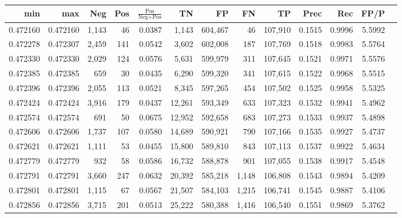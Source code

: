 \begin{tabular}{rrrrrrrrrrrrr}
\toprule
     min &      max &   Neg &   Pos & $\frac{\text{Pos}}{\text{Neg}+\text{Pos}}$ &      TN &      FP &      FN &      TP &   Prec &    Rec &   FP/P \\
\midrule
0.472160 & 0.472160 & 1,143 &    46 &                                     0.0387 &   1,143 & 604,467 &      46 & 107,910 & 0.1515 & 0.9996 & 5.5992 \\
0.472278 & 0.472307 & 2,459 &   141 &                                     0.0542 &   3,602 & 602,008 &     187 & 107,769 & 0.1518 & 0.9983 & 5.5764 \\
0.472330 & 0.472330 & 2,029 &   124 &                                     0.0576 &   5,631 & 599,979 &     311 & 107,645 & 0.1521 & 0.9971 & 5.5576 \\
0.472385 & 0.472385 &   659 &    30 &                                     0.0435 &   6,290 & 599,320 &     341 & 107,615 & 0.1522 & 0.9968 & 5.5515 \\
0.472396 & 0.472396 & 2,055 &   113 &                                     0.0521 &   8,345 & 597,265 &     454 & 107,502 & 0.1525 & 0.9958 & 5.5325 \\
0.472424 & 0.472424 & 3,916 &   179 &                                     0.0437 &  12,261 & 593,349 &     633 & 107,323 & 0.1532 & 0.9941 & 5.4962 \\
0.472574 & 0.472574 &   691 &    50 &                                     0.0675 &  12,952 & 592,658 &     683 & 107,273 & 0.1533 & 0.9937 & 5.4898 \\
0.472606 & 0.472606 & 1,737 &   107 &                                     0.0580 &  14,689 & 590,921 &     790 & 107,166 & 0.1535 & 0.9927 & 5.4737 \\
0.472621 & 0.472621 & 1,111 &    53 &                                     0.0455 &  15,800 & 589,810 &     843 & 107,113 & 0.1537 & 0.9922 & 5.4634 \\
0.472779 & 0.472779 &   932 &    58 &                                     0.0586 &  16,732 & 588,878 &     901 & 107,055 & 0.1538 & 0.9917 & 5.4548 \\
0.472791 & 0.472791 & 3,660 &   247 &                                     0.0632 &  20,392 & 585,218 &   1,148 & 106,808 & 0.1543 & 0.9894 & 5.4209 \\
0.472801 & 0.472801 & 1,115 &    67 &                                     0.0567 &  21,507 & 584,103 &   1,215 & 106,741 & 0.1545 & 0.9887 & 5.4106 \\
0.472856 & 0.472856 & 3,715 &   201 &                                     0.0513 &  25,222 & 580,388 &   1,416 & 106,540 & 0.1551 & 0.9869 & 5.3762 \\

\end{tabular}
